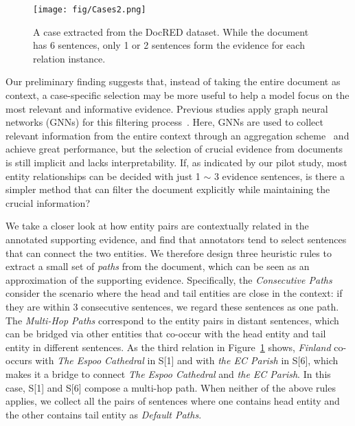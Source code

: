 \documentclass[11pt,a4paper]{article}
\begin{document}
\begin{figure}
    \centering
    \texttt{[image: fig/Cases2.png]}
    \caption{A case extracted from the DocRED dataset. While the document has 6 sentences, only 1 or 2 sentences form the evidence for each relation instance.}
    \label{fig:intro_case}
    \vspace{-0.4cm}
\end{figure}


Our preliminary finding suggests that, instead of taking the entire document as context, a case-specific selection may be more useful to help a model  focus on the most relevant and informative evidence. Previous studies apply graph neural networks (GNNs) for this filtering process~\cite{christopoulou2019connecting,zeng2020double}. Here, GNNs are used to collect relevant information from the entire context through an aggregation scheme~\cite{nan-etal-2020-reasoning} and achieve great performance, but the selection of crucial evidence from documents is still implicit and lacks interpretability. If, as indicated by our pilot study, most entity relationships can be decided with just 1 $\sim$ 3 evidence sentences, is there a simpler method that can filter the document explicitly while maintaining the crucial information?


We take a closer look at how entity pairs are contextually related in the annotated supporting evidence, and find that annotators tend to select sentences that can connect the two entities.
We therefore design three heuristic rules to extract a small set of \textit{paths} from the document, which can be seen as an approximation of the supporting evidence. Specifically, the \textit{Consecutive Paths} consider the scenario where the head and tail entities are close in the context: if they are within 3 consecutive sentences, we regard these sentences as one path. The \textit{Multi-Hop Paths} correspond to the entity pairs in distant sentences, which can be bridged via other entities that co-occur with the head entity and tail entity in different sentences. 
As the third relation in Figure~\ref{fig:intro_case} shows, \textit{Finland} co-occurs with \textit{The Espoo Cathedral} in S[1] and with \textit{the EC Parish} in S[6], which makes it a bridge to connect \textit{The Espoo Cathedral} and \textit{the EC Parish}. In this case, S[1] and S[6] compose a multi-hop path. When neither of the above rules applies, we collect all the pairs of sentences where one contains head entity and the other contains tail entity as \textit{Default Paths}.
\end{document}
